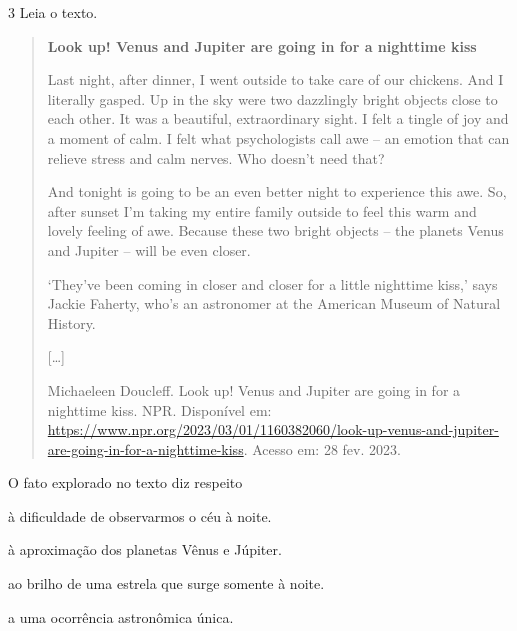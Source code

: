 
\num{3} Leia o texto.

\begin{quote}
\textbf{Look up! Venus and Jupiter are going in for a nighttime kiss}

Last night, after dinner, I went outside to take care of our chickens.
And I literally gasped. Up in the sky were two dazzlingly bright objects
close to each other. It was a beautiful, extraordinary sight. I felt a
tingle of joy and a moment of calm. I felt what psychologists call awe
-- an emotion that can relieve stress and calm nerves. Who doesn't need
that?

And tonight is going to be an even better night to experience this awe.
So, after sunset I'm taking my entire family outside to feel this warm
and lovely feeling of awe. Because these two bright objects -- the
planets Venus and Jupiter -- will be even closer.

`They've been coming in closer and closer for a little nighttime kiss,'
says Jackie Faherty, who's an astronomer at the American Museum of
Natural History.

{[}\ldots{}{]}

Michaeleen Doucleff. Look up! Venus and Jupiter are going in for a
nighttime kiss. NPR. Disponível em:
\url{https://www.npr.org/2023/03/01/1160382060/look-up-venus-and-jupiter-are-going-in-for-a-nighttime-kiss}.
Acesso em: 28 fev. 2023.
\end{quote}

O fato explorado no texto diz respeito

\begin{escolha}
\item à dificuldade de observarmos o céu à noite.

\item à aproximação dos planetas Vênus e Júpiter.

\item ao brilho de uma estrela que surge somente à noite.

\item a uma ocorrência astronômica única.
\end{escolha}

